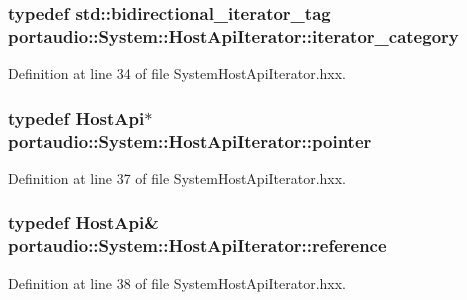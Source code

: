 \subsubsection[{\texorpdfstring{iterator\+\_\+category}{iterator_category}}]{\setlength{\rightskip}{0pt plus 5cm}typedef std\+::bidirectional\+\_\+iterator\+\_\+tag {\bf portaudio\+::\+System\+::\+Host\+Api\+Iterator\+::iterator\+\_\+category}}\hypertarget{classportaudio_1_1_system_1_1_host_api_iterator_a988f4cdc91839dd257b7d82be627cdf7}{}\label{classportaudio_1_1_system_1_1_host_api_iterator_a988f4cdc91839dd257b7d82be627cdf7}


Definition at line 34 of file System\+Host\+Api\+Iterator.\+hxx.

\subsubsection[{\texorpdfstring{pointer}{pointer}}]{\setlength{\rightskip}{0pt plus 5cm}typedef {\bf Host\+Api}$\ast$ {\bf portaudio\+::\+System\+::\+Host\+Api\+Iterator\+::pointer}}\hypertarget{classportaudio_1_1_system_1_1_host_api_iterator_aa3b63526bdfe9451e34c172fad7acfd9}{}\label{classportaudio_1_1_system_1_1_host_api_iterator_aa3b63526bdfe9451e34c172fad7acfd9}


Definition at line 37 of file System\+Host\+Api\+Iterator.\+hxx.

\subsubsection[{\texorpdfstring{reference}{reference}}]{\setlength{\rightskip}{0pt plus 5cm}typedef {\bf Host\+Api}\& {\bf portaudio\+::\+System\+::\+Host\+Api\+Iterator\+::reference}}\hypertarget{classportaudio_1_1_system_1_1_host_api_iterator_a6cf02d44899c4036dc8ef6c11c9758f5}{}\label{classportaudio_1_1_system_1_1_host_api_iterator_a6cf02d44899c4036dc8ef6c11c9758f5}


Definition at line 38 of file System\+Host\+Api\+Iterator.\+hxx.

